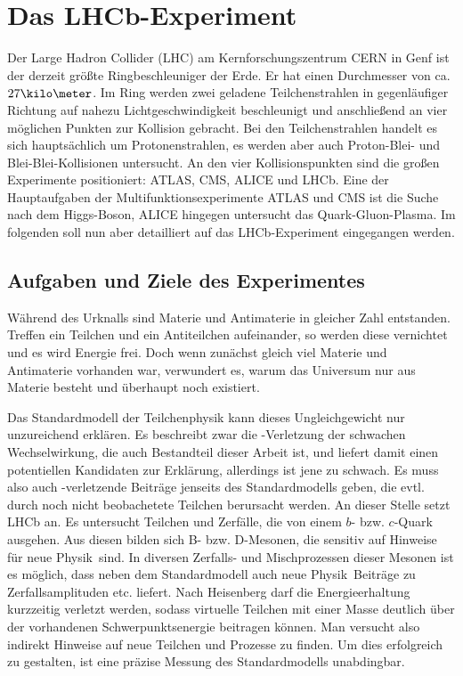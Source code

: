 \chapter{Das LHCb-Experiment}  \label{kap:experiment}
Der Large Hadron Collider (LHC) am Kernforschungszentrum CERN in Genf ist der derzeit größte Ringbeschleuniger der Erde. Er hat einen Durchmesser von ca. $27\kilo\meter$. Im Ring werden zwei geladene Teilchenstrahlen in gegenläufiger Richtung auf nahezu Lichtgeschwindigkeit beschleunigt und anschließend an vier möglichen Punkten zur Kollision gebracht. Bei den Teilchenstrahlen handelt es sich hauptsächlich um Protonenstrahlen, es werden aber auch Proton-Blei- und Blei-Blei-Kollisionen untersucht. An den vier Kollisionspunkten sind die großen Experimente positioniert: ATLAS, CMS, ALICE und LHCb. Eine der Hauptaufgaben der Multifunktionsexperimente ATLAS und CMS ist die Suche nach dem Higgs-Boson, ALICE hingegen untersucht das Quark-Gluon-Plasma. Im folgenden soll nun aber detailliert auf das LHCb-Experiment eingegangen werden. \cite{lhc-info}

\section{Aufgaben und Ziele des Experimentes}
Während des Urknalls sind Materie und Antimaterie in gleicher Zahl entstanden. Treffen ein Teilchen und ein Antiteilchen aufeinander, so werden diese vernichtet und es wird Energie frei. Doch wenn zunächst gleich viel Materie und Antimaterie vorhanden war, verwundert es, warum das Universum nur aus Materie besteht und überhaupt noch existiert.

Das Standardmodell der Teilchenphysik kann dieses Ungleichgewicht nur unzureichend erklären. Es beschreibt zwar die \CP-Verletzung der schwachen Wechselwirkung, die auch Bestandteil dieser Arbeit ist, und liefert damit einen potentiellen Kandidaten zur Erklärung, allerdings ist jene zu schwach. Es muss also auch \CP-verletzende Beiträge jenseits des Standardmodells geben, die evtl. durch noch nicht beobachetete Teilchen berursacht werden. An dieser Stelle setzt LHCb an. Es untersucht Teilchen und Zerfälle, die von einem $b$- bzw. $c$-Quark ausgehen. Aus diesen bilden sich B- bzw. D-Mesonen, die sensitiv auf Hinweise für \glqq neue Physik\grqq\ sind. In diversen Zerfalls- und Mischprozessen dieser Mesonen ist es möglich, dass neben dem Standardmodell auch \glqq neue Physik\grqq\ Beiträge zu Zerfallsamplituden etc. liefert. Nach Heisenberg darf die Energieerhaltung kurzzeitig verletzt werden, sodass virtuelle Teilchen mit einer Masse deutlich über der vorhandenen Schwerpunktsenergie beitragen können. Man versucht also indirekt Hinweise auf neue Teilchen und Prozesse zu finden. Um dies erfolgreich zu gestalten, ist eine präzise Messung des Standardmodells unabdingbar. \cite{cern-courier, roadmap, lhcb-info}


